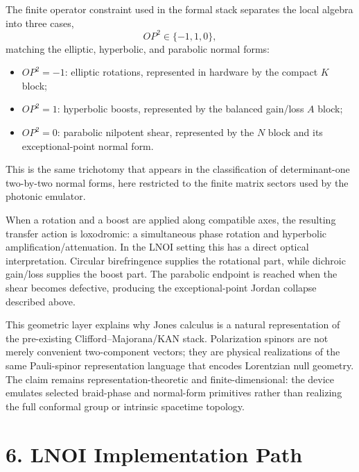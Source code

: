 \documentclass[aps,prl,twocolumn,superscriptaddress,amsmath,amssymb]{revtex4-2}
\begin{document}
The finite operator constraint used in the formal stack separates the local algebra into three cases,
\begin{equation}
OP^2\in\{-1,1,0\},
\end{equation}
matching the elliptic, hyperbolic, and parabolic normal forms:
\begin{itemize}
\item $OP^2=-1$: elliptic rotations, represented in hardware by the compact $K$ block;
\item $OP^2=1$: hyperbolic boosts, represented by the balanced gain/loss $A$ block;
\item $OP^2=0$: parabolic nilpotent shear, represented by the $N$ block and its exceptional-point normal form.
\end{itemize}
This is the same trichotomy that appears in the classification of determinant-one two-by-two normal forms, here restricted to the finite matrix sectors used by the photonic emulator.

When a rotation and a boost are applied along compatible axes, the resulting transfer action is loxodromic: a simultaneous phase rotation and hyperbolic amplification/attenuation. In the LNOI setting this has a direct optical interpretation. Circular birefringence supplies the rotational part, while dichroic gain/loss supplies the boost part. The parabolic endpoint is reached when the shear becomes defective, producing the exceptional-point Jordan collapse described above.

This geometric layer explains why Jones calculus is a natural representation of the pre-existing Clifford--Majorana/KAN stack. Polarization spinors are not merely convenient two-component vectors; they are physical realizations of the same Pauli-spinor representation language that encodes Lorentzian null geometry. The claim remains representation-theoretic and finite-dimensional: the device emulates selected braid-phase and normal-form primitives rather than realizing the full conformal group or intrinsic spacetime topology.

\section{6. LNOI Implementation Path}
\end{document}
